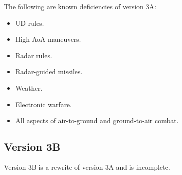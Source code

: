 \documentclass[10pt]{report}
\begin{document}
\begin{itemize}

    
    
    

\end{itemize}

The following are known deficiencies of version 3A:
\begin{itemize}
\item UD rules.
\item High AoA maneuvers.
\item Radar rules.
\item Radar-guided missiles.
\item Weather.
\item Electronic warfare.
\item All aspects of air-to-ground and ground-to-air combat.
\end{itemize}


\subsection{Version 3B}

Version 3B is a rewrite of version 3A and is incomplete.
\end{document}
